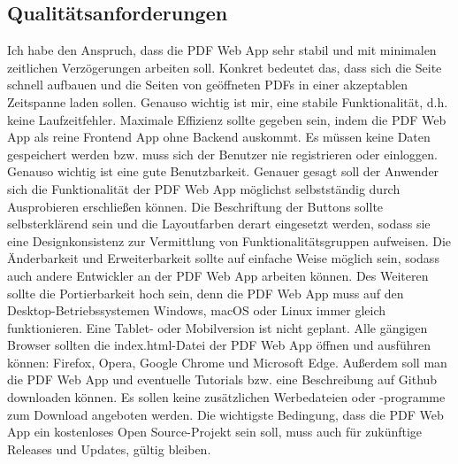 \subsection{Qualitätsanforderungen}
Ich habe den Anspruch, dass die PDF Web App sehr stabil und mit minimalen zeitlichen Verzögerungen arbeiten soll. Konkret bedeutet das, dass sich die Seite schnell aufbauen und die Seiten von geöffneten PDFs in einer akzeptablen Zeitspanne laden sollen. Genauso wichtig ist mir, eine stabile Funktionalität, d.h. keine Laufzeitfehler. Maximale Effizienz sollte gegeben sein, indem die PDF Web App als reine Frontend App ohne Backend auskommt. Es müssen keine Daten gespeichert werden bzw. muss sich der Benutzer nie registrieren oder einloggen. Genauso wichtig ist eine gute Benutzbarkeit. Genauer gesagt soll der Anwender sich die Funktionalität der PDF Web App möglichst selbstständig durch Ausprobieren erschließen können. Die Beschriftung der Buttons sollte selbsterklärend sein und die Layoutfarben derart eingesetzt werden, sodass sie eine Designkonsistenz zur Vermittlung von Funktionalitätsgruppen aufweisen. Die Änderbarkeit und Erweiterbarkeit sollte auf einfache Weise möglich sein, sodass auch andere Entwickler an der PDF Web App arbeiten können. Des Weiteren sollte die Portierbarkeit hoch sein, denn die PDF Web App muss auf den Desktop-Betriebssystemen Windows, macOS oder Linux immer gleich funktionieren. Eine Tablet- oder Mobilversion ist nicht geplant. Alle gängigen Browser sollten die index.html-Datei der PDF Web App öffnen und ausführen können: Firefox, Opera, Google Chrome und Microsoft Edge. Außerdem soll man die PDF Web App und eventuelle Tutorials bzw. eine Beschreibung auf Github downloaden können. Es sollen keine zusätzlichen Werbedateien oder -programme zum Download angeboten werden. Die wichtigste Bedingung, dass die PDF Web App ein kostenloses Open Source-Projekt sein soll, muss auch für zukünftige Releases und Updates, gültig bleiben.
